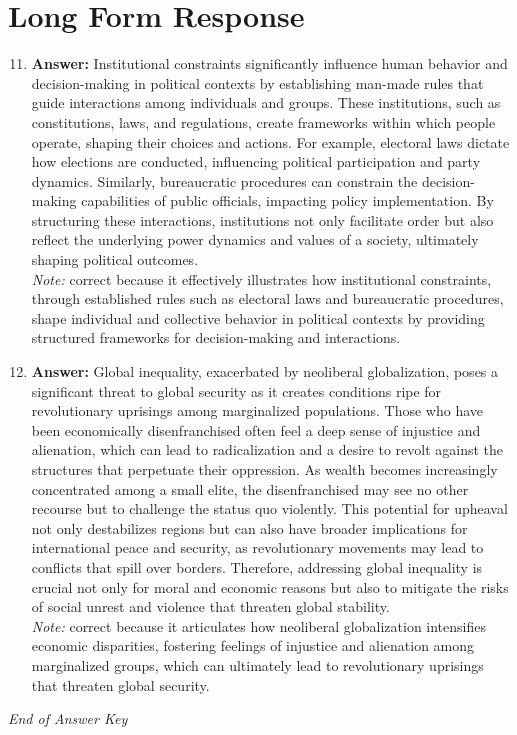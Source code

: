 \documentclass[12pt]{article}
\begin{document}
\section*{Long Form Response}
\begin{enumerate}[label=\arabic*.]
\setcounter{enumi}{10}
\item \textbf{Answer:} Institutional constraints significantly influence human behavior and decision-making in political contexts by establishing man-made rules that guide interactions among individuals and groups. These institutions, such as constitutions, laws, and regulations, create frameworks within which people operate, shaping their choices and actions. For example, electoral laws dictate how elections are conducted, influencing political participation and party dynamics. Similarly, bureaucratic procedures can constrain the decision-making capabilities of public officials, impacting policy implementation. By structuring these interactions, institutions not only facilitate order but also reflect the underlying power dynamics and values of a society, ultimately shaping political outcomes.
\\ \textit{Note:} correct because it effectively illustrates how institutional constraints, through established rules such as electoral laws and bureaucratic procedures, shape individual and collective behavior in political contexts by providing structured frameworks for decision-making and interactions.
\item \textbf{Answer:} Global inequality, exacerbated by neoliberal globalization, poses a significant threat to global security as it creates conditions ripe for revolutionary uprisings among marginalized populations. Those who have been economically disenfranchised often feel a deep sense of injustice and alienation, which can lead to radicalization and a desire to revolt against the structures that perpetuate their oppression. As wealth becomes increasingly concentrated among a small elite, the disenfranchised may see no other recourse but to challenge the status quo violently. This potential for upheaval not only destabilizes regions but can also have broader implications for international peace and security, as revolutionary movements may lead to conflicts that spill over borders. Therefore, addressing global inequality is crucial not only for moral and economic reasons but also to mitigate the risks of social unrest and violence that threaten global stability.
\\ \textit{Note:} correct because it articulates how neoliberal globalization intensifies economic disparities, fostering feelings of injustice and alienation among marginalized groups, which can ultimately lead to revolutionary uprisings that threaten global security.
\end{enumerate}

\vfill
\noindent\textit{End of Answer Key}
\end{document}
